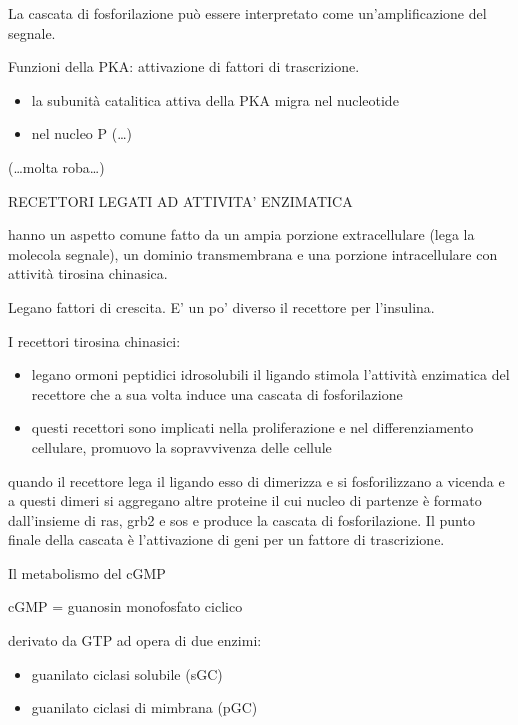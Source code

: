 \documentclass[]{article}
\begin{document}
La cascata di fosforilazione può essere interpretato come
un'amplificazione del segnale.

Funzioni della PKA: attivazione di fattori di trascrizione.

\begin{itemize}
\itemsep1pt\parskip0pt
\item
  la subunità catalitica attiva della PKA migra nel nucleotide
\item
  nel nucleo P (\ldots{})
\end{itemize}

(\ldots{}molta roba\ldots{})

RECETTORI LEGATI AD ATTIVITA' ENZIMATICA

hanno un aspetto comune fatto da un ampia porzione extracellulare (lega
la molecola segnale), un dominio transmembrana e una porzione
intracellulare con attività tirosina chinasica.

Legano fattori di crescita. E' un po' diverso il recettore per
l'insulina.

I recettori tirosina chinasici:

\begin{itemize}
\itemsep1pt\parskip0pt
\item
  legano ormoni peptidici idrosolubili il ligando stimola l'attività
  enzimatica del recettore che a sua volta induce una cascata di
  fosforilazione
\item
  questi recettori sono implicati nella proliferazione e nel
  differenziamento cellulare, promuovo la sopravvivenza delle cellule
\end{itemize}

quando il recettore lega il ligando esso di dimerizza e si
fosforilizzano a vicenda e a questi dimeri si aggregano altre proteine
il cui nucleo di partenze è formato dall'insieme di ras, grb2 e sos e
produce la cascata di fosforilazione. Il punto finale della cascata è
l'attivazione di geni per un fattore di trascrizione.

Il metabolismo del cGMP

cGMP = guanosin monofosfato ciclico

derivato da GTP ad opera di due enzimi:

\begin{itemize}
\itemsep1pt\parskip0pt
\item
  guanilato ciclasi solubile (sGC)
\item
  guanilato ciclasi di mimbrana (pGC)
\end{itemize}
\end{document}
